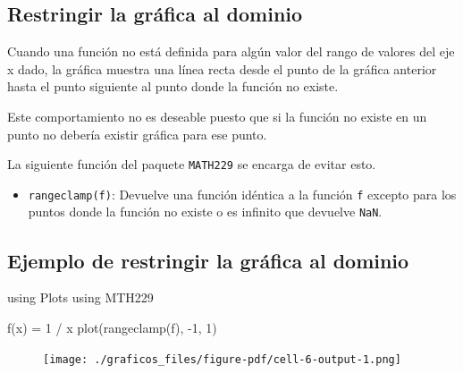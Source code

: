 \documentclass[
  letterpaper,
  DIV=11,
  numbers=noendperiod]{scrreprt}
\newenvironment{Shaded}{\begin{snugshade}}{\end{snugshade}}
\newcommand{\BuiltInTok}[1]{\textcolor[rgb]{0.00,0.23,0.31}{#1}}
\newcommand{\FloatTok}[1]{\textcolor[rgb]{0.68,0.00,0.00}{#1}}
\newcommand{\FunctionTok}[1]{\textcolor[rgb]{0.28,0.35,0.67}{#1}}
\newcommand{\ImportTok}[1]{\textcolor[rgb]{0.00,0.46,0.62}{#1}}
\newcommand{\NormalTok}[1]{\textcolor[rgb]{0.00,0.23,0.31}{#1}}
\newcommand{\OperatorTok}[1]{\textcolor[rgb]{0.37,0.37,0.37}{#1}}
\providecommand{\tightlist}{%
  \setlength{\itemsep}{0pt}\setlength{\parskip}{0pt}}\usepackage{longtable,booktabs,array}
\begin{document}
\hypertarget{restringir-la-gruxe1fica-al-dominio}{%
\subsection{Restringir la gráfica al
dominio}\label{restringir-la-gruxe1fica-al-dominio}}

Cuando una función no está definida para algún valor del rango de
valores del eje x dado, la gráfica muestra una línea recta desde el
punto de la gráfica anterior hasta el punto siguiente al punto donde la
función no existe.

Este comportamiento no es deseable puesto que si la función no existe en
un punto no debería existir gráfica para ese punto.

La siguiente función del paquete \texttt{MATH229} se encarga de evitar
esto.

\begin{itemize}
\tightlist
\item
  \texttt{rangeclamp(f)}: Devuelve una función idéntica a la función
  \texttt{f} excepto para los puntos donde la función no existe o es
  infinito que devuelve \texttt{NaN}.
\end{itemize}

\hypertarget{ejemplo-de-restringir-la-gruxe1fica-al-dominio}{%
\subsection{Ejemplo de restringir la gráfica al
dominio}\label{ejemplo-de-restringir-la-gruxe1fica-al-dominio}}

\begin{Shaded}
\begin{Highlighting}[]
\ImportTok{using} \BuiltInTok{Plots}
\ImportTok{using} \BuiltInTok{MTH229}

\FunctionTok{f}\NormalTok{(x) }\OperatorTok{=} \FloatTok{1} \OperatorTok{/}\NormalTok{ x}
\FunctionTok{plot}\NormalTok{(}\FunctionTok{rangeclamp}\NormalTok{(f), }\OperatorTok{{-}}\FloatTok{1}\NormalTok{, }\FloatTok{1}\NormalTok{)}
\end{Highlighting}
\end{Shaded}

\begin{figure}[H]

{\centering \texttt{[image: ./graficos\_files/figure-pdf/cell-6-output-1.png]}

}

\end{figure}
\end{document}
